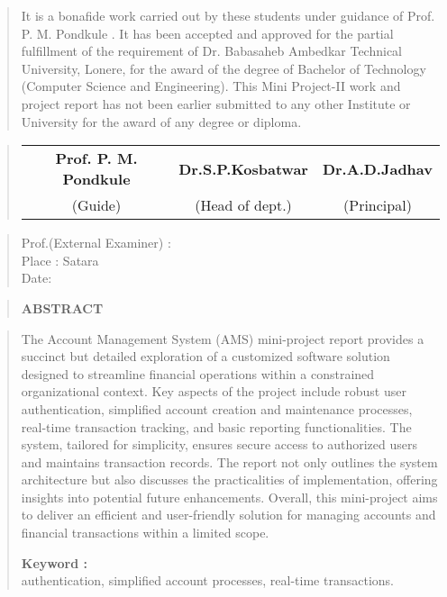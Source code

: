 \documentclass[12pt]{report}
\begin{document}
	\vspace{0.7cm}
	\begin{quote}
		\normalsize
		It is a bonafide work carried out by these students under guidance of
   	Prof. P. M. Pondkule . It has been accepted and approved for the partial
		fulfillment of the requirement of Dr. Babasaheb Ambedkar Technical
		University, Lonere, for the award of the degree of Bachelor of
		Technology (Computer Science and Engineering). This Mini Project-II work and project
		report has not been earlier submitted to any other Institute or University for the
		award of any degree or diploma.
	\end{quote}
	
	\begin{quote}
		\normalsize
		\centering
		\vspace{3cm}
		\begin{table}[ht]
			\centering
			\begin{tabular}{c   c   c}
				\bfseries
		Prof. P. M. Pondkule & \bfseries Dr.S.P.Kosbatwar & \bfseries Dr.A.D.Jadhav \\[2ex]
				(Guide) & (Head of dept.) & (Principal)\\[2ex]
			\end{tabular}
		\end{table}
	\end{quote}
	\vspace{2cm}
	\begin{quote}
		Prof.(External Examiner) :\\Place : Satara\\Date:
	\end{quote}
	\newpage
	
	
	\begin{quote}
		\centering
		\LARGE
		\textbf{ABSTRACT}
	\end{quote}
	
	
	\begin{quote}
		
		\hspace{1cm}The Account Management System (AMS) mini-project report provides a succinct but detailed exploration of a customized software solution designed to streamline financial operations within a constrained organizational context. Key aspects of the project include robust user authentication, simplified account creation and maintenance processes, real-time transaction tracking, and basic reporting functionalities. The system, tailored for simplicity, ensures secure access to authorized users and maintains transaction records. The report not only outlines the system architecture but also discusses the practicalities of implementation, offering insights into potential future enhancements. Overall, this mini-project aims to deliver an efficient and user-friendly solution for managing accounts and financial transactions within a limited scope.
		
		\textbf{Keyword :}\\[1ex]
	authentication, simplified account processes, real-time transactions.
		
		
		
		

	\end{quote}
	\clearpage
	\tableofcontents
	\newpage
	
\end{document}
